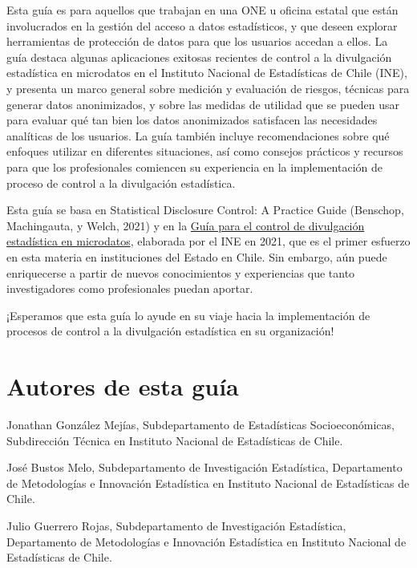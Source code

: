 \documentclass[]{book}
\theoremstyle{definition}
\theoremstyle{definition}
\theoremstyle{definition}
\theoremstyle{definition}
\theoremstyle{remark}
\begin{document}
Esta guía es para aquellos que trabajan en una ONE u oficina estatal que están involucrados en la gestión del acceso a datos estadísticos, y que deseen explorar herramientas de protección de datos para que los usuarios accedan a ellos. La guía destaca algunas aplicaciones exitosas recientes de control a la divulgación estadística en microdatos en el Instituto Nacional de Estadísticas de Chile (INE), y presenta un marco general sobre medición y evaluación de riesgos, técnicas para generar datos anonimizados, y sobre las medidas de utilidad que se pueden usar para evaluar qué tan bien los datos anonimizados satisfacen las necesidades analíticas de los usuarios. La guía también incluye recomendaciones sobre qué enfoques utilizar en diferentes situaciones, así como consejos prácticos y recursos para que los profesionales comiencen su experiencia en la implementación de proceso de control a la divulgación estadística.

Esta guía se basa en Statistical Disclosure Control: A Practice Guide (Benschop, Machingauta, y Welch, 2021) y en la \href{https://www.ine.gob.cl/docs/default-source/buenas-practicas/directrices-metodologicas/guias-y-orientaciones-metodologicas/documentos/gu\%C3\%ADa-control-divulgaci\%C3\%B3n-estad\%C3\%ADstica-microdatos.pdf?sfvrsn=b6bdd28f_2}{Guía para el control de divulgación estadística en microdatos}, elaborada por el INE en 2021, que es el primer esfuerzo en esta materia en instituciones del Estado en Chile. Sin embargo, aún puede enriquecerse a partir de nuevos conocimientos y experiencias que tanto investigadores como profesionales puedan aportar.

¡Esperamos que esta guía lo ayude en su viaje hacia la implementación de procesos de control a la divulgación estadística en su organización!

\hypertarget{autores-de-esta-guuxeda}{%
\section{Autores de esta guía}\label{autores-de-esta-guuxeda}}

Jonathan González Mejías, Subdepartamento de Estadísticas Socioeconómicas, Subdirección Técnica en Instituto Nacional de Estadísticas de Chile.

José Bustos Melo, Subdepartamento de Investigación Estadística, Departamento de Metodologías e Innovación Estadística en Instituto Nacional de Estadísticas de Chile.

Julio Guerrero Rojas, Subdepartamento de Investigación Estadística, Departamento de Metodologías e Innovación Estadística en Instituto Nacional de Estadísticas de Chile.
\end{document}
